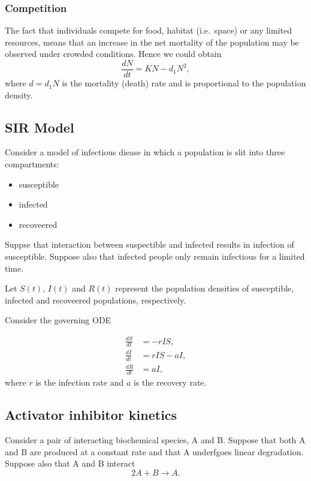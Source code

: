 \documentclass[
  letterpaper,
  DIV=11,
  numbers=noendperiod]{scrreprt}
\providecommand{\tightlist}{%
  \setlength{\itemsep}{0pt}\setlength{\parskip}{0pt}}\usepackage{longtable,booktabs,array}
\theoremstyle{definition}
\theoremstyle{plain}
\theoremstyle{plain}
\theoremstyle{remark}
\begin{document}
\hypertarget{competition}{%
\subsubsection{Competition}\label{competition}}

The fact that individuals compete for food, habitat (i.e.~space) or any
limited resources, means that an increase in the net mortality of the
population may be observed under crowded conditions. Hence we could
obtain \[
\frac{dN}{dt} = KN - d_1 N^2 , 
\] where \(d=d_1N\) is the mortality (death) rate and is proportional to
the population density.

\hypertarget{sir-model}{%
\subsection{SIR Model}\label{sir-model}}

Consider a model of infectious diease in which a population is slit into
three compartments:

\begin{itemize}
\tightlist
\item
  susceptible
\item
  infected
\item
  recoveered
\end{itemize}

Suppse that interaction between suspectible and infected results in
infection of susceptible. Suppose also that infected people only remain
infectious for a limited time.

Let \(S(t)\), \(I(t)\) and \(R(t)\) represent the population densities
of susceptible, infected and recoveered populations, respectively.

Consider the governing ODE

\[
\begin{aligned}
\frac{d S}{ dt} &= -rIS, \\
\frac{d I}{ dt} &= rIS - aI, \\
\frac{d R}{ dt} &= aI,
\end{aligned}
\] where \(r\) is the infection rate and \(a\) is the recovery rate.

\hypertarget{activator-inhibitor-kinetics}{%
\subsection{Activator inhibitor
kinetics}\label{activator-inhibitor-kinetics}}

Consider a pair of interacting biochemical species, A and B. Suppose
that both A and B are produced at a constant rate and that A underfgoes
linear degradation. Suppose also that A and B interact \[
2A+B \rightarrow A.
\]
\end{document}
